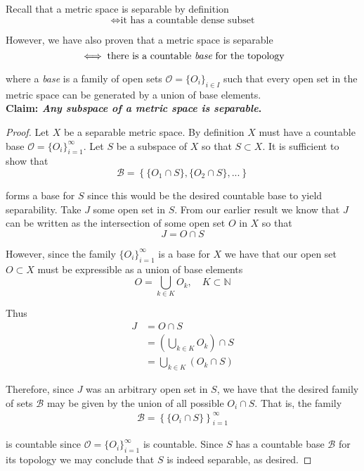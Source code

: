 \documentclass[12pt]{article}
\newlength\tindent
\renewcommand{\indent}{\hspace*{\tindent}}
\begin{document}
Recall that a metric space is separable by definition
\begin{equation*} 
	\iff \text{it has a countable dense subset}
\end{equation*}

However, we have also proven that a metric space is separable
\begin{equation*}
	\iff \text{there is a countable {\em base} for the topology}
\end{equation*}

where a {\em base} is a family of open sets $\mathcal O = \{O_i\}_{i \in I}$ such that every open set in the metric space can be generated by a union of base elements. \\

%
%
{\bf Claim: {\em Any subspace of a metric space is separable}.} 

\begin{proof} Let $X$ be a separable metric space. By definition $X$ must have a countable base $\mathcal O = \{O_i\}^\infty_{i = 1}$. Let $S$ be a subspace of $X$ so that $S \subset X$. It is sufficient to show that
\begin{equation*}
	\mathcal B = \left\{ \{O_1 \cap S\}, \{O_2 \cap S\}, ... \right\}
\end{equation*}

forms a base for $S$ since this would be the desired countable base to yield separability. Take $J$ some open set in $S$. From our earlier result we know that $J$ can be written as the intersection of some open set $O$ in $X$ so that
\begin{equation*}
	J = O \cap S
\end{equation*}

However, since the family $\{O_i\}^\infty_{i = 1}$ is a base for $X$ we have that our open set $O \subset X$ must be expressible as a union of base elements
\begin{equation*}
	O = \bigcup_{k \in K} O_k, \quad K \subset \mathbb N
\end{equation*}

Thus
\begin{align*}
	J &= O \cap S \\
	&= \left( \bigcup_{k \in K} O_k \right) \cap S \\
	&= \bigcup_{k \in K} \left( O_k \cap S \right) 
\end{align*}

\indent Therefore, since $J$ was an arbitrary open set in $S$, we have that the desired family of sets $\mathcal B$ may be given by the union of all possible $O_i \cap S$. That is, the family
\begin{align*}
	\mathcal B = \left\{ \{O_i \cap S\} \right\}^\infty_{i = 1}
\end{align*}

is countable since $\mathcal O = \{O_i\}^\infty_{i = 1}$ is countable. Since $S$ has a countable base $\mathcal B$ for its topology we may conclude that $S$ is indeed separable, as desired.
\end{proof} \hfill
\end{document}
